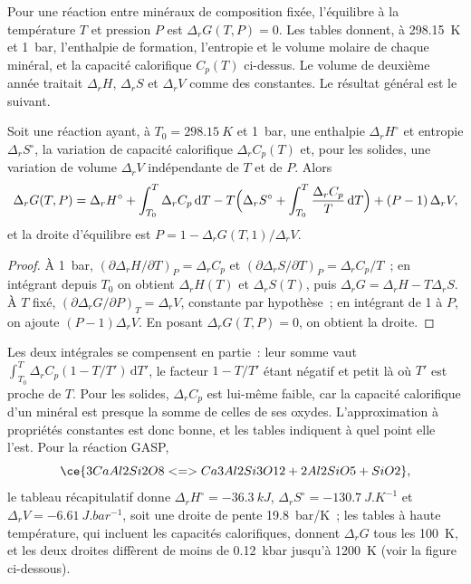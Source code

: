 Pour une réaction entre minéraux de composition fixée, l'équilibre à la
température $T$ et pression $P$ est $\Delta_rG(T, P) = 0$. Les tables donnent, à
\qty{298.15}{K} et \qty{1}{bar}, l'enthalpie de formation, l'entropie et
le volume molaire de chaque minéral, et la capacité calorifique $C_p(T)$ ci-dessus. Le
volume de deuxième année traitait $\Delta_rH$, $\Delta_rS$ et $\Delta_rV$ comme des constantes. Le
résultat général est le suivant.

\begin{theorem}\label{thm:b3:petrological-thermodynamics:dg}
Soit une réaction ayant, à $T_0 = \qty{298.15}{K}$ et \qty{1}{bar}, une
enthalpie $\Delta_rH^\circ$ et entropie $\Delta_rS^\circ$, la variation de capacité
calorifique $\Delta_rC_p(T)$ et, pour les solides, une variation de volume $\Delta_rV$
indépendante de $T$ et de $P$. Alors
\[
  \Delta_rG(T, P) = \Delta_rH^\circ + \int_{T_0}^{T}\Delta_rC_p\,\mathrm dT
  - T\Bigl(\Delta_rS^\circ + \int_{T_0}^{T}\frac{\Delta_rC_p}{T}\,\mathrm dT\Bigr)
  + (P - 1)\,\Delta_rV ,
\]
et la droite d'équilibre est $P = 1 - \Delta_rG(T, 1)/\Delta_rV$.
\end{theorem}

\begin{proof}
À \qty{1}{bar}, $(\partial\Delta_rH/\partial T)_P = \Delta_rC_p$ et
$(\partial\Delta_rS/\partial T)_P = \Delta_rC_p/T$~; en intégrant depuis $T_0$
on obtient $\Delta_rH(T)$ et $\Delta_rS(T)$, puis $\Delta_rG = \Delta_rH -
T\Delta_rS$. À $T$ fixé, $(\partial\Delta_rG/\partial P)_T = \Delta_rV$,
constante par hypothèse~; en intégrant de 1 à $P$, on ajoute $(P - 1)\Delta_rV$.
En posant $\Delta_rG(T, P) = 0$, on obtient la droite.
\end{proof}

Les deux intégrales se compensent en partie~: leur somme vaut $\int_{T_0}^T\Delta_rC_p(1 -
T/T')\,\mathrm dT'$, le facteur $1 - T/T'$ étant négatif et petit
là où $T'$ est proche de $T$. Pour les solides, $\Delta_rC_p$ est lui-même faible,
car la capacité calorifique d'un minéral est presque la somme de celles de ses
oxydes. L'approximation à propriétés constantes est donc bonne, et les
tables indiquent à quel point elle l'est. Pour la réaction GASP,
\[
  \ce{3 CaAl2Si2O8 <=> Ca3Al2Si3O12 + 2 Al2SiO5 + SiO2},
\]
le tableau récapitulatif donne $\Delta_rH^\circ = \qty{-36.3}{kJ}$,
$\Delta_rS^\circ = \qty{-130.7}{J.K^{-1}}$ et $\Delta_rV =
\qty{-6.61}{J.bar^{-1}}$, soit une droite de pente \qty{19.8}{bar/K}~; les
tables à haute température, qui incluent les capacités calorifiques, donnent
$\Delta_rG$ tous les \qty{100}{K}, et les deux droites diffèrent de moins de
\qty{0.12}{kbar} jusqu'à \qty{1200}{K} (voir la figure ci-dessous).

